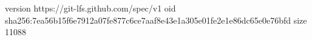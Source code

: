 version https://git-lfs.github.com/spec/v1
oid sha256:7ea56b15f6e7912a07fe877c6ce7aaf8e43e1a305e01fe2e1e86dc65e0e76bfd
size 11088
